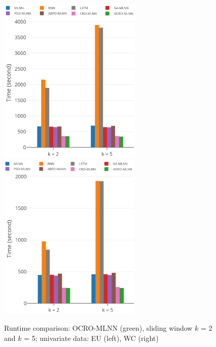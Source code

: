 \documentclass[11pt,twoside]{article}
\begin{document}
\begin{multicols}{2}
\begin{figure}[!t]
	\centering
	\begin{minipage}[t]{1.0\textwidth}
		\centering
		\includegraphics[width=0.45\textwidth =0cm 0cm 0cm 0cm, height = 8cm]{images/pdf/time/time_eu.pdf}
		\centering
		\includegraphics[width=0.45\textwidth =0cm 0cm 0cm 0cm, height = 8cm]{images/pdf/time/time_wc.pdf}
	\end{minipage}
	\caption{Runtime comparison: OCRO-MLNN (green), sliding window $k$ = 2 and $k$ = 5; univariate data: EU (left), WC (right)} 
	\label{fig:speed_system_univariate}
\end{figure}


\end{multicols}
\end{document}
